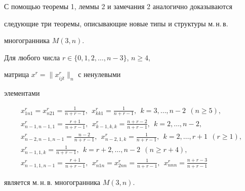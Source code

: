 С помощью теоремы 1, леммы 2 и замечания 2 аналогично доказываются


следующие три теоремы, описывающие новые типы и структуры м.\,н.\,в.


многогранника $M(3,n)$.





\begin{thm}


Для любого числа $r\in \{0,1,2,\dotsc,n-3\}$, $n\geq 4$,


матрица $x^r=\|x^r_{ijt}\|_n$ с ненулевыми


элементами


\begin{gather*}


x^r_{1n1}=x^r_{n21}=\frac{1}{n+r-1},\ \ x^r_{kk1}=\frac{1}{n+r-1},


\ \ k=3,\dotsc,n-2\ \ (n\geq 5),\\


%


x^r_{n-1,n-1,1}=\frac{r+1}{n+r-1},\ \ x^r_{k-1,k,k}=\frac{n+r-2}{n+r-1},


\ \ k=2,\dotsc,n-2,\\


%


x^r_{n-2,n-1,n-1}=\frac{n-2}{n+r-1},\ \ x^r_{n-2,1,k}=\frac{1}{n+r-1},


\ \ k=2,\dotsc,r+1\ \ (r\geq 1),\\


%


x^r_{n-1,1,k}=\frac{1}{n+r-1},\ \ k=r+2,\dotsc,n-2\ \ (n\geq r+4),\\


%


x^r_{n-1,1,n-1}=\frac{r+1}{n+r-1},\ \ x^r_{n1n}=x^r_{2nn}=\frac{1}{n+r-1},


\ \ x^r_{nnn}=\frac{n+r-3}{n+r-1}


\end{gather*}


является м.\,н.\,в. многогранника $M(3,n)$.


\end{thm}





